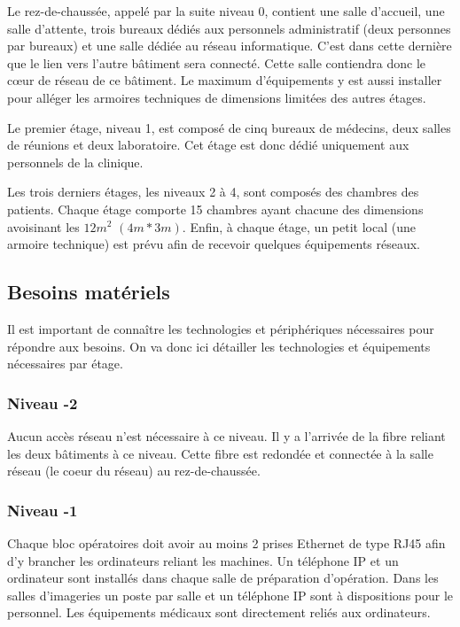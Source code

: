 Le rez-de-chaussée, appelé par la suite niveau 0, contient une salle d'accueil, une salle d'attente, trois bureaux dédiés aux personnels administratif (deux personnes par bureaux) et une salle dédiée au réseau informatique.
C'est dans cette dernière que le lien vers l'autre bâtiment sera connecté.
Cette salle contiendra donc le cœur de réseau de ce bâtiment.
Le maximum d'équipements y est aussi installer pour alléger les armoires techniques de dimensions limitées des autres étages.

Le premier étage, niveau 1, est composé de cinq bureaux de médecins, deux salles de réunions et deux laboratoire.
Cet étage est donc dédié uniquement aux personnels de la clinique.

Les trois derniers étages, les niveaux 2 à 4, sont composés des chambres des patients.
Chaque étage comporte 15 chambres ayant chacune des dimensions avoisinant les $12m^{2}$ $(4m * 3m)$.
Enfin, à chaque étage, un petit local (une armoire technique) est prévu afin de recevoir quelques équipements réseaux.


%
    \cleardoublepage
%
%
\subsection{Besoins matériels}

Il est important de connaître les technologies et périphériques nécessaires pour répondre aux besoins.
On va donc ici détailler les technologies et équipements nécessaires par étage.

\subsubsection{Niveau -2}
Aucun accès réseau n'est nécessaire à ce niveau.
Il y a l'arrivée de la fibre reliant les deux bâtiments à ce niveau.
Cette fibre est redondée et connectée à la salle réseau (le coeur du réseau) au rez-de-chaussée.

\subsubsection{Niveau -1}
Chaque bloc opératoires doit avoir au moins 2 prises Ethernet de type RJ45 afin d'y brancher les ordinateurs reliant les machines.
Un téléphone IP et un ordinateur sont installés dans chaque salle de préparation d'opération.
Dans les salles d'imageries un poste par salle et un téléphone IP sont à dispositions pour le personnel.
Les équipements médicaux sont directement reliés aux ordinateurs.


